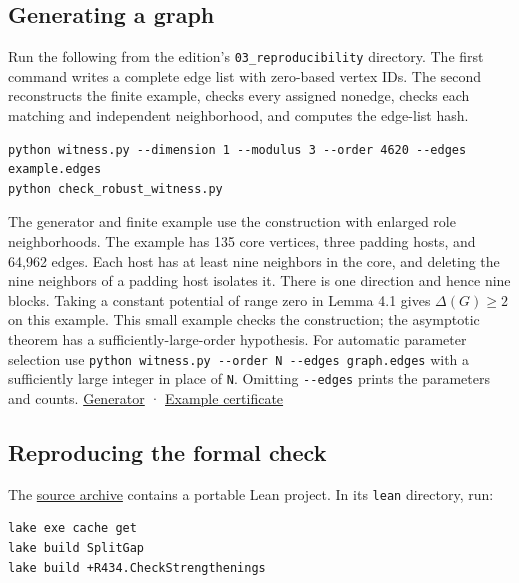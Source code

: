 \documentclass[english,11pt,a4paper]{article}
\newcounter{none}
\begin{document}
\subsection{Generating a graph}\label{generating-a-graph}

Run the following from the edition's \texttt{03\_reproducibility} directory. The first command writes a complete edge list with zero-based vertex IDs. The second reconstructs the finite example, checks every assigned nonedge, checks each matching and independent neighborhood, and computes the edge-list hash.

\begin{verbatim}
python witness.py --dimension 1 --modulus 3 --order 4620 --edges example.edges
python check_robust_witness.py
\end{verbatim}

The generator and finite example use the construction with enlarged role neighborhoods. The example has 135 core vertices, three padding hosts, and 64,962 edges. Each host has at least nine neighbors in the core, and deleting the nine neighbors of a padding host isolates it. There is one direction and hence nine blocks. Taking a constant potential of range zero in Lemma 4.1 gives \(\Delta(G)\ge2\) on this example. This small example checks the construction; the asymptotic theorem has a sufficiently-large-order hypothesis. For automatic parameter selection use \texttt{python\ witness.py\ -\/-order\ N\ -\/-edges\ graph.edges} with a sufficiently large integer in place of \texttt{N}. Omitting \texttt{-\/-edges} prints the parameters and counts. \href{https://github.com/jtraverso/split-clique-partition-gap/blob/main/preprints/SPLITGAP/03_reproducibility/witness.py}{Generator} · \href{https://github.com/jtraverso/split-clique-partition-gap/blob/main/preprints/SPLITGAP/03_reproducibility/robust-example.json}{Example certificate}

\subsection{Reproducing the formal check}\label{reproducing-the-formal-check}

The \href{https://github.com/jtraverso/split-clique-partition-gap/blob/main/preprints/SPLITGAP/05_formalization/split-gap-lean-v1.0.zip}{source archive} contains a portable Lean project. In its \texttt{lean} directory, run:

\begin{verbatim}
lake exe cache get
lake build SplitGap
lake build +R434.CheckStrengthenings
\end{verbatim}
\end{document}
